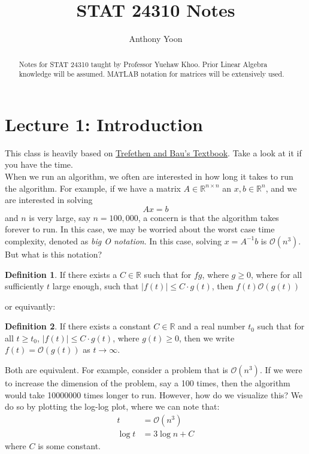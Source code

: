 \documentclass[11pt]{article}
\title{STAT 24310 Notes}
\author{Anthony Yoon}
\theoremstyle{definition}
\newtheorem{definition}{Definition}[section]
\newcommand{\R}{\mathbb{R}}
\begin{document}
\maketitle
\begin{abstract}
  Notes for STAT 24310 taught by Professor Yuehaw Khoo. Prior Linear Algebra knowledge will be assumed.  MATLAB notation for matrices will be extensively used. 
\end{abstract}
\tableofcontents
\newpage
\section{Lecture 1: Introduction}
This class is heavily based on \href{https://www.stat.uchicago.edu/~lekheng/courses/309/books/Trefethen-Bau.pdf}{Trefethen and Bau's Textbook}. Take a look at it if you have the time. \\
When we run an algorithm, we often are interested in how long it takes to run the algorithm. For example, if we have a matrix $A \in \R^{n \times n}$ an $x, b \in \R^n$, and we are interested in solving 
\[
Ax = b
\]
and $n$ is very large, say $ n = 100,000$, a concern is that the algorithm takes forever to run. In this case, we may be worried about the worst case time complexity, denoted as \emph{big O notation}. In this case, solving $x = A^{-1} b$ is $\mathcal{O}(n^3)$. But what is this notation? 
\begin{definition}
  If there exists a $C \in \R$ such that for $f g$, where $g \geq 0$, where for all sufficiently $t$ large enough, such that $|f(t)| \leq C \cdot g(t)$, then $f(t) \mathcal{O}(g(t))$ 
\end{definition}
or equivantly:
\begin{definition}
  If there exists a constant \( C \in \mathbb{R} \) and a real number \( t_0 \) such that for all \( t \geq t_0 \), \( |f(t)| \leq C \cdot g(t) \), where \( g(t) \geq 0 \), then we write \( f(t) = \mathcal{O}(g(t)) \) as \( t \to \infty \).
\end{definition}
Both are equivalent. For example, consider a problem that is $\mathcal{O}(n^3)$. If we were to increase the dimension of the problem, say a 100 times, then the algorithm would take 10000000 times longer to run. However, how do we visualize this? We do so by plotting the log-log plot, where we can note that:
\begin{align*}
  t &= \mathcal{O}(n^3)\\
  \log t &= 3 \log n + C
\end{align*}
where $C$ is some constant. 
\end{document}
